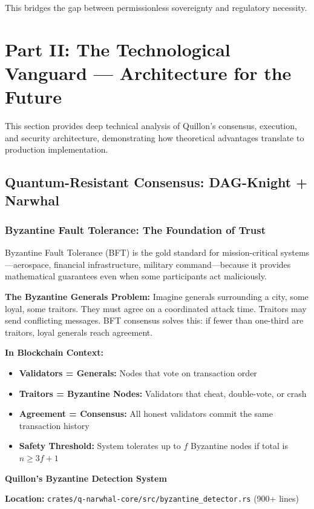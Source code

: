 \documentclass[11pt,a4paper]{article}
\begin{document}
This bridges the gap between permissionless sovereignty and regulatory necessity.

\newpage
\section{Part II: The Technological Vanguard — Architecture for the Future}

This section provides deep technical analysis of Quillon's consensus, execution, and security architecture, demonstrating how theoretical advantages translate to production implementation.

\subsection{Quantum-Resistant Consensus: DAG-Knight + Narwhal}

\subsubsection{Byzantine Fault Tolerance: The Foundation of Trust}

Byzantine Fault Tolerance (BFT) is the gold standard for mission-critical systems—aerospace, financial infrastructure, military command—because it provides mathematical guarantees even when some participants act maliciously.

\textbf{The Byzantine Generals Problem:} Imagine generals surrounding a city, some loyal, some traitors. They must agree on a coordinated attack time. Traitors may send conflicting messages. BFT consensus solves this: if fewer than one-third are traitors, loyal generals reach agreement.

\textbf{In Blockchain Context:}
\begin{itemize}[leftmargin=*]
\item \textbf{Validators = Generals:} Nodes that vote on transaction order
\item \textbf{Traitors = Byzantine Nodes:} Validators that cheat, double-vote, or crash
\item \textbf{Agreement = Consensus:} All honest validators commit the same transaction history
\item \textbf{Safety Threshold:} System tolerates up to $f$ Byzantine nodes if total is $n \geq 3f+1$
\end{itemize}

\textbf{Quillon's Byzantine Detection System}

\textbf{Location:} \texttt{crates/q-narwhal-core/src/byzantine\_detector.rs} (900+ lines)
\end{document}
